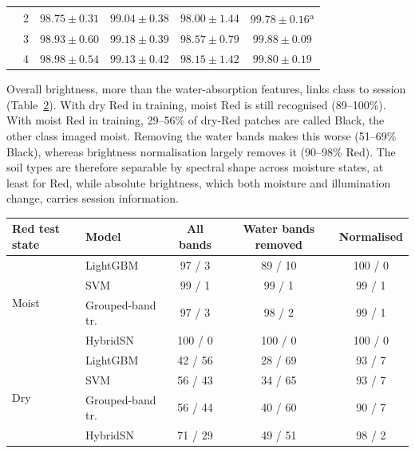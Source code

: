 \documentclass[]{interact}
\begin{document}
\begin{table}
{{\begin{tabular}{lccccc}
 & 2 & $98.75 \pm 0.31$ & $99.04 \pm 0.38$ & $98.00 \pm 1.44$ & $\mathbf{99.78 \pm 0.16}$\textsuperscript{a} \\
 & 3 & $98.93 \pm 0.60$ & $99.18 \pm 0.39$ & $98.57 \pm 0.79$ & $\mathbf{99.88 \pm 0.09}$ \\
 & 4 & $98.98 \pm 0.54$ & $99.13 \pm 0.42$ & $98.15 \pm 1.42$ & $\mathbf{99.80 \pm 0.19}$ \\
\bottomrule
\end{tabular}}}
\label{tab:soil}
\end{table}

Overall brightness, more than the water-absorption features, links class to session (Table~\ref{tab:cross}). With dry Red in training, moist Red is still recognised (89--100\%). With moist Red in training, 29--56\% of dry-Red patches are called Black, the other class imaged moist. Removing the water bands makes this worse (51--69\% Black), whereas brightness normalisation largely removes it (90--98\% Red). The soil types are therefore separable by spectral shape across moisture states, at least for Red, while absolute brightness, which both moisture and illumination change, carries session information.

\begin{table}
{\begin{tabular}{llccc}
\toprule
Red test state & Model & All bands & Water bands removed & Normalised \\
\midrule
\multirow{4}{*}{Moist}
 & LightGBM & 97 / 3 & 89 / 10 & 100 / 0 \\
 & SVM & 99 / 1 & 99 / 1 & 99 / 1 \\
 & Grouped-band tr. & 97 / 3 & 98 / 2 & 99 / 1 \\
 & HybridSN & 100 / 0 & 100 / 0 & 100 / 0 \\
\midrule
\multirow{4}{*}{Dry}
 & LightGBM & 42 / 56 & 28 / 69 & 93 / 7 \\
 & SVM & 56 / 43 & 34 / 65 & 93 / 7 \\
 & Grouped-band tr. & 56 / 44 & 40 / 60 & 90 / 7 \\
 & HybridSN & 71 / 29 & 49 / 51 & 98 / 2 \\
\bottomrule
\end{tabular}}
\label{tab:cross}
\end{table}
\end{document}
